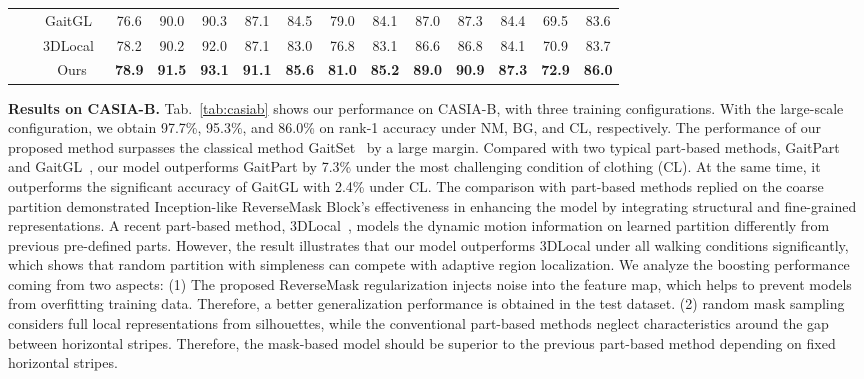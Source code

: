 \documentclass[runningheads]{llncs}
\begin{document}
\begin{table*}[ht]
{\begin{tabular}{c|c|c|c|c|c|c|c|c|c|c|c|c|c|c}
\cline{3-15}          &       & \multicolumn{1}{c|}{GaitGL~\cite{gaitgl}} & 76.6  & 90.0  & 90.3  & 87.1  & 84.5  & 79.0  & 84.1  & 87.0  & 87.3  & 84.4  & 69.5  & 83.6   \\
\cline{3-15}          &       & \multicolumn{1}{c|}{3DLocal~\cite{3dlocal}} & 78.2  & 90.2  & 92.0  & 87.1  & 83.0  & 76.8  & 83.1  & 86.6  & 86.8  & 84.1  & 70.9  & 83.7   \\
\cline{3-15}          &       & Ours  & \textbf{78.9} & \textbf{91.5} & \textbf{93.1} & \textbf{91.1} & \textbf{85.6} & \textbf{81.0} & \textbf{85.2} & \textbf{89.0} & \textbf{90.9} & \textbf{87.3} & \textbf{72.9} & \textbf{86.0}  \\

    \bottomrule
    \end{tabular}}
\label{comparision_casia}
\vspace*{-1em}
\end{table*}


\textbf{Results on CASIA-B.} Tab.~\ref{tab:casiab} shows our performance on CASIA-B, with three training configurations. With the large-scale configuration, we obtain 97.7\%, 95.3\%, and 86.0\% on rank-1 accuracy under NM, BG, and CL, respectively. The performance of our proposed method surpasses the classical method GaitSet~\cite{aaai2019gaitset} by a large margin. Compared with two typical part-based methods, GaitPart~\cite{gaitpart} and GaitGL~\cite{gaitgl}, our model outperforms GaitPart by 7.3\% under the most challenging condition of clothing (CL). At the same time, it outperforms the significant accuracy of GaitGL with 2.4\% under CL. The comparison with part-based methods replied on the coarse partition demonstrated Inception-like ReverseMask Block's effectiveness in enhancing the model by integrating structural and fine-grained representations. A recent part-based method, 3DLocal~\cite{3dlocal}, models the dynamic motion information on learned partition differently from previous pre-defined parts. However, the result illustrates that our model outperforms 3DLocal under all walking conditions significantly, which shows that random partition with simpleness can compete with adaptive region localization. We analyze the boosting performance coming from two aspects: (1) The proposed ReverseMask regularization injects noise into the feature map, which helps to prevent models from overfitting training data. Therefore, a better generalization performance is obtained in the test dataset. (2) random mask sampling considers full local representations from silhouettes, while the conventional part-based methods neglect characteristics around the gap between horizontal stripes. Therefore, the mask-based model should be superior to the previous part-based method depending on fixed horizontal stripes. 
\end{document}
